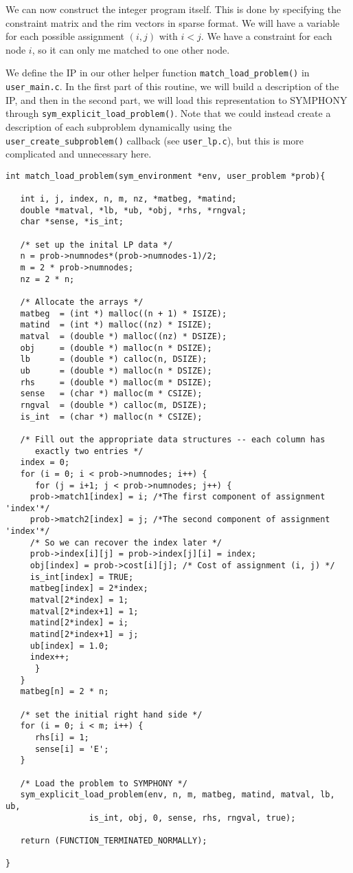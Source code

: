 \documentclass[11pt]{article}
\begin{document}
We can now construct the integer program itself. This is done by specifying
the constraint matrix and the rim vectors in sparse format. We will have a
variable for each possible assignment $(i,j)$ with $i<j$. We have a constraint
for each node $i$, so it can only me matched to one other node.

We define the IP in our other helper function \texttt{match\_load\_problem()}
in \texttt{user\_main.c}. In the first part of this routine, we will build a
description of the IP, and then in the second part, we will load this
representation to SYMPHONY through
\texttt{sym\_explicit\_load\_problem()}. Note that we could instead create a
description of each subproblem dynamically using the
\texttt{user\_create\_subproblem()} callback (see \texttt{user\_lp.c}), but
this is more complicated and unnecessary here.

\begin{verbatim}
int match_load_problem(sym_environment *env, user_problem *prob){
   
   int i, j, index, n, m, nz, *matbeg, *matind;
   double *matval, *lb, *ub, *obj, *rhs, *rngval;
   char *sense, *is_int;
   
   /* set up the inital LP data */
   n = prob->numnodes*(prob->numnodes-1)/2;
   m = 2 * prob->numnodes;
   nz = 2 * n;

   /* Allocate the arrays */
   matbeg  = (int *) malloc((n + 1) * ISIZE);
   matind  = (int *) malloc((nz) * ISIZE);
   matval  = (double *) malloc((nz) * DSIZE);
   obj     = (double *) malloc(n * DSIZE);
   lb      = (double *) calloc(n, DSIZE);
   ub      = (double *) malloc(n * DSIZE);
   rhs     = (double *) malloc(m * DSIZE);
   sense   = (char *) malloc(m * CSIZE);
   rngval  = (double *) calloc(m, DSIZE);
   is_int  = (char *) malloc(n * CSIZE);
   
   /* Fill out the appropriate data structures -- each column has
      exactly two entries */
   index = 0;
   for (i = 0; i < prob->numnodes; i++) {
      for (j = i+1; j < prob->numnodes; j++) {
	 prob->match1[index] = i; /*The first component of assignment 'index'*/
	 prob->match2[index] = j; /*The second component of assignment 'index'*/
	 /* So we can recover the index later */
	 prob->index[i][j] = prob->index[j][i] = index;
	 obj[index] = prob->cost[i][j]; /* Cost of assignment (i, j) */
	 is_int[index] = TRUE;
	 matbeg[index] = 2*index;
	 matval[2*index] = 1;
	 matval[2*index+1] = 1;
	 matind[2*index] = i;
	 matind[2*index+1] = j;
	 ub[index] = 1.0;
	 index++;
      }
   }
   matbeg[n] = 2 * n;
   
   /* set the initial right hand side */
   for (i = 0; i < m; i++) {
      rhs[i] = 1;
      sense[i] = 'E';
   }
   
   /* Load the problem to SYMPHONY */   
   sym_explicit_load_problem(env, n, m, matbeg, matind, matval, lb, ub, 
			     is_int, obj, 0, sense, rhs, rngval, true);
			     
   return (FUNCTION_TERMINATED_NORMALLY);

}
\end{verbatim}
\end{document}
